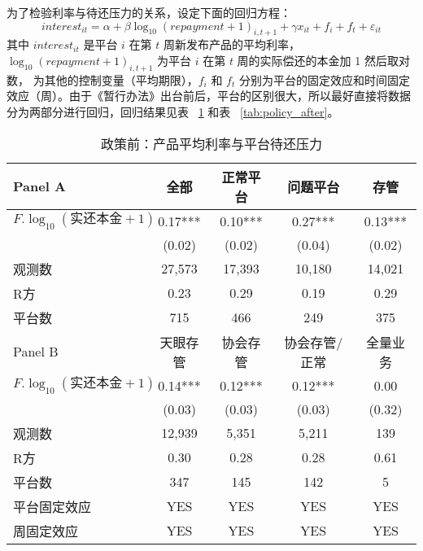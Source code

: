 \documentclass[lang=cn,11pt]{elegantpaper}
\begin{document}
为了检验利率与待还压力的关系，设定下面的回归方程：
\begin{equation}
interest_{it} = \alpha + \beta \log_{10}(repayment + 1)_{i,t+1} + \gamma x_{it} + f_{i} + f_{t} + \varepsilon_{it}
\end{equation}
其中 $interest_{it}$ 是平台 $i$ 在第 $t$ 周新发布产品的平均利率，$\log_{10}(repayment + 1)_{i,t+1}$ 为平台 $i$ 在第 $t$ 周的实际偿还的本金加 1 然后取对数， 为其他的控制变量（平均期限），$f_i$ 和 $f_t$ 分别为平台的固定效应和时间固定效应（周）。由于《暂行办法》出台前后，平台的区别很大，所以最好直接将数据分为两部分进行回归，回归结果见表 ~\ref{tab:policy_before} 和表 ~\ref{tab:policy_after}。 

\begin{table}[htbp]
  \centering
  \caption{政策前：产品平均利率与平台待还压力}
    \begin{tabular}{lcccc}
    \toprule
    Panel A & 全部    & 正常平台  & 问题平台  & 存管 \\
    \midrule
    $F.\log_{10}(\text{实还本金}+1)$ & 0.17*** & 0.10*** & 0.27*** & 0.13*** \\
          & (0.02) & (0.02) & (0.04) & (0.02) \\
    观测数   & 27,573 & 17,393 & 10,180 & 14,021 \\
    R方    & 0.23  & 0.29  & 0.19  & 0.29 \\
    平台数   & 715   & 466   & 249   & 375 \\
    \midrule
    Panel B & 天眼存管  & 协会存管  & 协会存管/正常 & 全量业务 \\
    \midrule
    $F.\log_{10}(\text{实还本金}+1)$ & 0.14*** & 0.12*** & 0.12*** & 0.00 \\
          & (0.03) & (0.03) & (0.03) & (0.32) \\
    观测数   & 12,939 & 5,351 & 5,211 & 139 \\
    R方    & 0.30  & 0.28  & 0.28  & 0.61 \\
    平台数   & 347   & 145   & 142   & 5 \\
    平台固定效应 & YES   & YES   & YES   & YES \\
    周固定效应 & YES   & YES   & YES   & YES \\
    \bottomrule
    \end{tabular}%
  \label{tab:policy_before}%
\end{table}%
\end{document}

